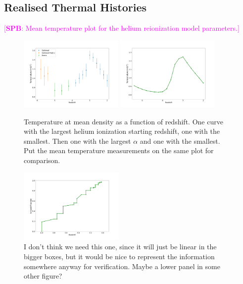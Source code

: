 \documentclass[a4paper,11pt]{article}
\newcommand{\spb}[1]{{\textcolor{magenta}{[{\bf SPB}: #1]}}}
\begin{document}
\subsection{Realised Thermal Histories}
\spb{Mean temperature plot for the helium reionization model parameters.}

\begin{figure}
\includegraphics[width=0.45\textwidth]{figures/temp_observed.pdf}
\includegraphics[width=0.45\textwidth]{figures/temps.pdf}
 \caption{Temperature at mean density as a function of redshift. One curve with the largest helium ionization starting redshift, one with the smallest. Then one with the largest $\alpha$ and one with the smallest. Put the mean temperature measurements on the same plot for comparison. \cite{Gaikwad:2021}}
 \label{fig:heliumtempdens}
\end{figure}

\begin{figure}
\includegraphics[width=0.45\textwidth]{figures/HeIonFrac.pdf}
 \caption{I don't think we need this one, since it will just be linear in the bigger boxes, but it would be nice to represent the information somewhere anyway for verification. Maybe a lower panel in some other figure?}
 \label{fig:heliumionizationfrac}
\end{figure}
\end{document}
